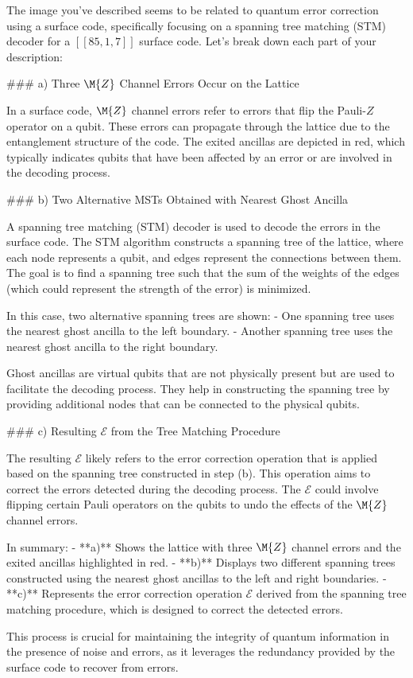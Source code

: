 The image you've described seems to be related to quantum error correction using a surface code, specifically focusing on a spanning tree matching (STM) decoder for a $[[85,1,7]]$ surface code. Let's break down each part of your description:

### a) Three $\M{Z}$ Channel Errors Occur on the Lattice

In a surface code, $\M{Z}$ channel errors refer to errors that flip the Pauli-$Z$ operator on a qubit. These errors can propagate through the lattice due to the entanglement structure of the code. The exited ancillas are depicted in red, which typically indicates qubits that have been affected by an error or are involved in the decoding process.

### b) Two Alternative MSTs Obtained with Nearest Ghost Ancilla

A spanning tree matching (STM) decoder is used to decode the errors in the surface code. The STM algorithm constructs a spanning tree of the lattice, where each node represents a qubit, and edges represent the connections between them. The goal is to find a spanning tree such that the sum of the weights of the edges (which could represent the strength of the error) is minimized.

In this case, two alternative spanning trees are shown:
- One spanning tree uses the nearest ghost ancilla to the left boundary.
- Another spanning tree uses the nearest ghost ancilla to the right boundary.

Ghost ancillas are virtual qubits that are not physically present but are used to facilitate the decoding process. They help in constructing the spanning tree by providing additional nodes that can be connected to the physical qubits.

### c) Resulting $\mathcal{E}$ from the Tree Matching Procedure

The resulting $\mathcal{E}$ likely refers to the error correction operation that is applied based on the spanning tree constructed in step (b). This operation aims to correct the errors detected during the decoding process. The $\mathcal{E}$ could involve flipping certain Pauli operators on the qubits to undo the effects of the $\M{Z}$ channel errors.

In summary:
- **a)** Shows the lattice with three $\M{Z}$ channel errors and the exited ancillas highlighted in red.
- **b)** Displays two different spanning trees constructed using the nearest ghost ancillas to the left and right boundaries.
- **c)** Represents the error correction operation $\mathcal{E}$ derived from the spanning tree matching procedure, which is designed to correct the detected errors.

This process is crucial for maintaining the integrity of quantum information in the presence of noise and errors, as it leverages the redundancy provided by the surface code to recover from errors.